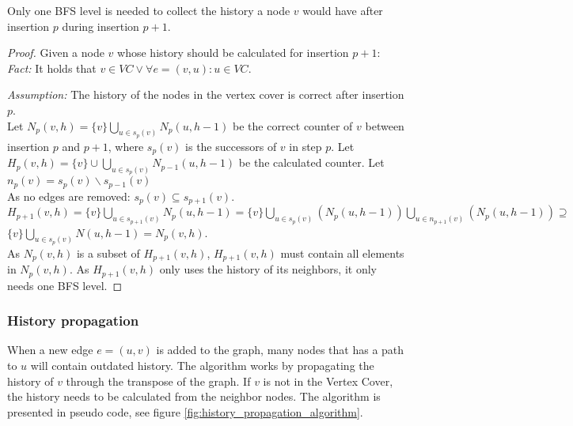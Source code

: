 \begin{lemma} Only one BFS level is needed to collect the history a node $v$ would have after insertion $p$ during insertion $p+1$. 
\label{lemma:partial_history_calculation}

\begin{proof} Given a node $v$ whose history should be calculated for insertion $p+1$:\\

\noindent\textit{Fact:} It holds that $v \in VC \vee \forall e = (v,u) : u \in VC$.

\noindent\textit{Assumption:} The history of the nodes in the vertex cover is correct after insertion $p$.\\ 

\noindent Let $N_p(v,h) = \{v\}\bigcup\limits_{u \in s_p(v)} N_p(u,h-1) $ be the correct counter of $v$ between insertion $p$ and $p+1$, where $s_p(v)$ is the successors of $v$ in step $p$. Let $H_p(v,h) = \{v\}\cup\bigcup\limits_{u\in s_{p}(v)}N_{p-1}(u,h-1)$ be the calculated counter. Let $n_p(v)=s_p(v)\backslash s_{p-1}(v)$\\


\noindent As no edges are removed: 
$s_p(v) \subseteq s_{p+1}(v)$.\\ 
$H_{p+1}(v,h) = \{v\}\bigcup\limits_{u\in s_{p+1}(v)}N_{p}(u,h-1) = \{v\}\bigcup\limits_{u\in s_{p}(v)}(N_{p}(u,h-1)) \bigcup\limits_{u\in n_{p+1}(v)}(N_{p}(u,h-1)) \supseteq $\\ $\{v\}\bigcup\limits_{u \in s_p(v)} N(u,h-1) = N_p(v,h)$. \\

\noindent As $N_p(v,h)$ is a subset of $H_{p+1}(v,h)$, $H_{p+1}(v,h)$ must contain all elements in $N_p(v,h)$. As $H_{p+1}(v,h)$ only uses the history of its neighbors, it only needs one BFS level.

\end{proof} 
\end{lemma}

\subsubsection{History propagation}

When a new edge $e = (u,v)$ is added to the graph, many nodes that has a path to $u$ will contain outdated history. The algorithm works by propagating the history of $v$ through the transpose of the graph. If $v$ is not in the Vertex Cover, the history needs to be calculated from the neighbor nodes. The algorithm is presented in pseudo code, see figure \ref{fig:history_propagation_algorithm}.

